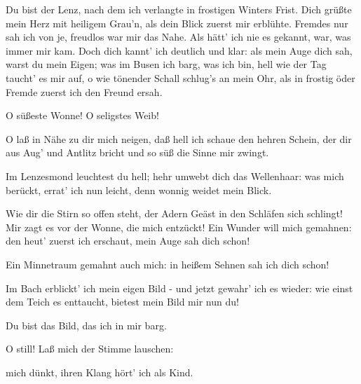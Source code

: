 \begin{drama}
\Sieglindespeaks
Du bist der Lenz, nach dem ich verlangte
in frostigen Winters Frist.
Dich grüßte mein Herz mit heiligem Grau'n,
als dein Blick zuerst mir erblühte.
Fremdes nur sah ich von je,
freudlos war mir das Nahe.
Als hätt' ich nie es gekannt, war, was immer mir kam.
Doch dich kannt' ich deutlich und klar:
als mein Auge dich sah,
warst du mein Eigen;
was im Busen ich barg, was ich bin,
hell wie der Tag taucht' es mir auf,
o wie tönender Schall schlug's an mein Ohr,
als in frostig öder Fremde
zuerst ich den Freund ersah.
 




\Siegmundspeaks


O süßeste Wonne!
O seligstes Weib!
 

\Sieglindespeaks


O laß in Nähe zu dir mich neigen,
daß hell ich schaue den hehren Schein,
der dir aus Aug' und Antlitz bricht
und so süß die Sinne mir zwingt.
 

\Siegmundspeaks
Im Lenzesmond leuchtest du hell;
hehr umwebt dich das Wellenhaar:
was mich berückt, errat' ich nun leicht,
denn wonnig weidet mein Blick.
 

\Sieglindespeaks


Wie dir die Stirn so offen steht,
der Adern Geäst in den Schläfen sich schlingt!
Mir zagt es vor der Wonne, die mich entzückt!
Ein Wunder will mich gemahnen:
den heut' zuerst ich erschaut,
mein Auge sah dich schon!
 

\Siegmundspeaks
Ein Minnetraum gemahnt auch mich:
in heißem Sehnen sah ich dich schon!
 

\Sieglindespeaks
Im Bach erblickt' ich mein eigen Bild -
und jetzt gewahr' ich es wieder:
wie einst dem Teich es enttaucht,
bietest mein Bild mir nun du!
 

\Siegmundspeaks
Du bist das Bild,
das ich in mir barg.
 

\Sieglindespeaks


O still! Laß mich der Stimme lauschen:
 

mich dünkt, ihren Klang
hört' ich als Kind.
 



\end{drama}
